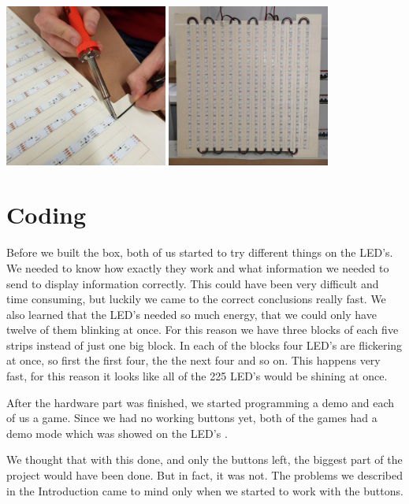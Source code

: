 \documentclass[a4paper,12pt]{article}
\begin{document}
{ \centering
  \includegraphics[width = 0.4\textwidth]{loten.jpg}
  \space{   }
  \includegraphics[width = 0.4\textwidth]{matrix.jpg}
  \\}
 \vspace{1cm}
 
\section{Coding}
Before we built the box, both of us started to try different things on the LED's.
 We needed to know how exactly they work and what information we needed to send to display information correctly.
 This could have been very difficult and time consuming, but luckily we came to the correct conclusions really fast. 
 We also learned that  the LED's needed so much energy, that we could only have twelve of them blinking at once.
 For this reason we have three blocks of each five strips instead of just one big block.
 In each of the blocks four LED's are flickering at once, so first the first four, the the next four and so on.
 This happens very fast, for this reason it looks like all of the 225 LED's would be shining at once.

After the hardware part was finished, we started programming a demo and each of us a game.
 Since we had no working buttons yet, both of the games had a demo mode which was showed on the LED's .

We thought that with this done, and only the buttons left, the biggest part of the project would have been done.
 But in fact, it was not.
 The problems we described in the Introduction came to mind only when we started to work with the buttons.
 
\end{document}
